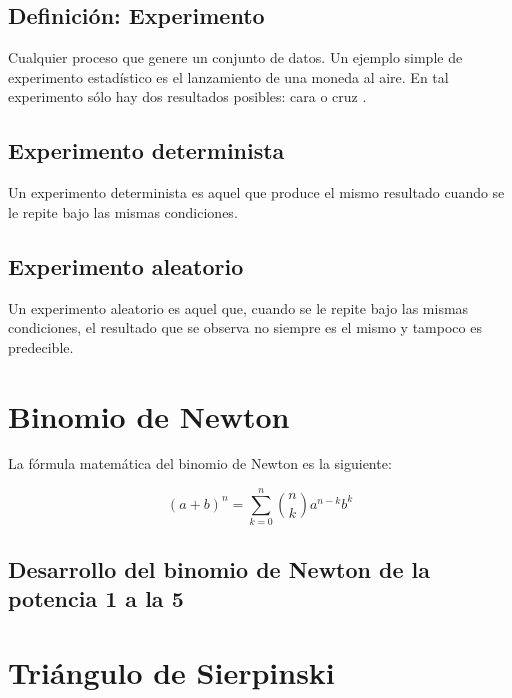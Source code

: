 \documentclass{article}
\begin{document}
\subsection{Definici\'on: Experimento}

Cualquier proceso que genere un conjunto de datos. Un ejemplo simple de
experimento estad\'istico es el lanzamiento de una moneda al aire. En tal
experimento s\'olo hay dos resultados posibles: cara o cruz
\cite{walpole2012probabilidad}.

\subsection{Experimento determinista}
Un experimento determinista es aquel que produce el mismo resultado cuando se le
repite bajo las mismas condiciones.

\subsection{Experimento aleatorio}
Un experimento aleatorio es aquel que, cuando se le repite bajo las mismas
condiciones, el resultado que se observa no siempre es el mismo y tampoco es
predecible.

\section{Binomio de Newton}

La fórmula matemática del binomio de Newton es la siguiente:

\begin{equation}
    (a+b)^n = \sum_{k=0}^{n} \binom{n}{k} a^{n-k} b^k
\end{equation}

\subsection{Desarrollo del binomio de Newton de la potencia 1 a la 5}



\section{Tri\'angulo de Sierpinski}
\end{document}
